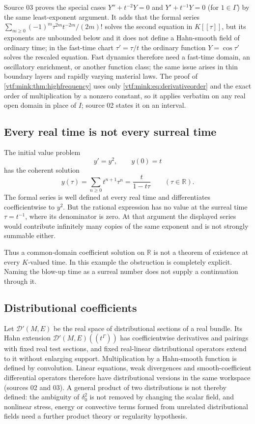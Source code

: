\documentclass[11pt,letterpaper]{article}
\theoremstyle{definition}
\theoremstyle{remark}
\newcommand{\R}{\mathbb R}\newcommand{\C}{\mathbb C}
\begin{document}
Source 03 proves the special cases $Y''+t^{-2}Y=0$ and $Y'+t^{-1}Y=0$ (for
$1\in\Gamma$) by the same least-exponent argument. It adds that the formal
series $\sum_{m\ge0}(-1)^m\tau^{2m}t^{-2m}/(2m)!$ solves the second equation in
$K[[\tau]]$, but its exponents are unbounded below and it does not define a
Hahn-smooth field of ordinary time; in the fast-time chart $\tau'=\tau/t$ the
ordinary function $Y=\cos\tau'$ solves the rescaled equation. Fast dynamics
therefore need a fast-time domain, an oscillatory enrichment, or another
function class; the same issue arises in thin boundary layers and rapidly
varying material laws. The proof of \cref{vtf:mink:thm:highfrequency} uses only
\eqref{vtf:mink:eq:derivativeorder} and the exact order of multiplication by a
nonzero constant, so it applies verbatim on any real open domain in place of $I$;
source 02 states it on an interval.

\subsection{Every real time is not every surreal time}\label{vtf:mink:subsec:realtime}
The initial value problem
\begin{equation}
 y'=y^2,\qquad y(0)=t
\end{equation}
has the coherent solution
\begin{equation}\label{vtf:mink:eq:blowupexample}
 y(\tau)=\sum_{n\geq0}t^{n+1}\tau^n
         =\frac{t}{1-t\tau}
 \qquad(\tau\in\R).
\end{equation}
The formal series is well defined at every real time and differentiates coefficientwise to $y^2$. But the rational expression has no value at the surreal time $\tau=t^{-1}$, where its denominator is zero. At that argument the displayed series would contribute infinitely many copies of the same exponent and is not strongly summable either.

Thus a common-domain coefficient solution on $\R$ is not a theorem of existence at every $K$-valued time. In this example the obstruction is completely explicit. Naming the blow-up time as a surreal number does not supply a continuation through it.

\subsection{Distributional coefficients}\label{vtf:subsec:distributions}

Let $\mathcal D'(M,E)$ be the real space of distributional sections of a real
bundle. Its Hahn extension $\mathcal D'(M,E)((t^\Gamma))$ has coefficientwise
derivatives and pairings with fixed real test sections, and fixed real-linear
distributional operators extend to it without enlarging support. Multiplication
by a Hahn-smooth function is defined by convolution. Linear equations, weak
divergences and smooth-coefficient differential operators therefore have
distributional versions in the same workspace (sources 02 and 03). A general
product of two distributions is not thereby defined: the ambiguity of
$\delta_0^2$ is not removed by changing the scalar field, and nonlinear stress,
energy or convective terms formed from unrelated distributional fields need a
further product theory or regularity hypothesis.
\end{document}
